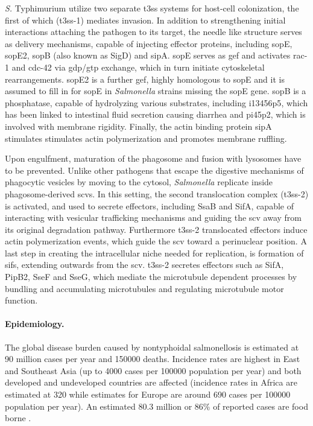 \textit{S.} Typhimurium utilize two separate \gls{t3ss} systems for host-cell colonization, the first of which (\gls{t3ss}-1) mediates invasion. In addition to strengthening initial interactions attaching the pathogen to its target, the needle like structure serves as delivery mechanisms, capable of injecting effector proteins, including \gls{sop}E, \gls{sop}E2, \gls{sop}B (also known as SigD) and \gls{sip}A. \Gls{sop}E serves as \gls{gef} and activates \gls{rac-1} and \gls{cdc-42} via \acrshort{gdp}/\acrshort{gtp} exchange, which in turn initiate cytoskeletal rearrangements. \Gls{sop}E2 is a further \gls{gef}, highly homologous to \gls{sop}E and it is assumed to fill in for \gls{sop}E in \textit{Salmonella} strains missing the \gls{sop}E gene. \Gls{sop}B is a phosphatase, capable of hydrolyzing various substrates, including \gls{i13456p5}, which has been linked to intestinal fluid secretion causing diarrhea and \gls{pi45p2}, which is involved with membrane rigidity. Finally, the actin binding protein \gls{sip}A  stimulates stimulates actin polymerization and promotes membrane ruffling.

Upon engulfment, maturation of the phagosome and fusion with lysosomes have to be prevented. Unlike other pathogens that escape the digestive mechanisms of phagocytic vesicles by moving to the cytosol, \textit{Salmonella} replicate inside phagosome-derived \glspl{scv}. In this setting, the second translocation complex (\gls{t3ss}-2) is activated, and used to secrete effectors, including SsaB and SifA, capable of interacting with vesicular trafficking mechanisms and guiding the \gls{scv} away from its original degradation pathway. Furthermore \gls{t3ss}-2 translocated effectors induce actin polymerization events, which guide the \gls{scv} toward a perinuclear position. A last step in creating the intracellular niche needed for replication, is formation of \glspl{sif}, extending outwards from the \gls{scv}. \Gls{t3ss}-2 secretes effectors such as SifA, PipB2, SseF and SseG, which mediate the microtubule dependent processes by bundling and accumulating microtubules and regulating microtubule motor function.

\paragraph{Epidemiology.}
The global disease burden caused by nontyphoidal salmonellosis is estimated at 90 million cases per year and 150000 deaths. Incidence rates are highest in East and Southeast Asia (up to 4000 cases per 100000 population per year) and both developed and undeveloped countries are affected (incidence rates in Africa are estimated at 320 while estimates for Europe are around 690 cases per 100000 population per year). An estimated 80.3 million or 86\% of reported cases are food borne \citep{Majowicz2010}.

